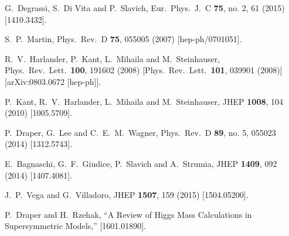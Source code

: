\documentclass[12pt]{article}
\begin{document}
\begin{thebibliography}{999}
  G.~Degrassi, S.~Di Vita and P.~Slavich,
  Eur.\ Phys.\ J.\ C {\bf 75}, no. 2, 61 (2015)
  [1410.3432].

  S.~P.~Martin,
  Phys.\ Rev.\ D {\bf 75}, 055005 (2007)
  [hep-ph/0701051].

  R.~V.~Harlander, P.~Kant, L.~Mihaila and M.~Steinhauser,
  Phys.\ Rev.\ Lett.\  {\bf 100}, 191602 (2008)
  [Phys.\ Rev.\ Lett.\  {\bf 101}, 039901 (2008)]
  [arXiv:0803.0672 [hep-ph]].

  P.~Kant, R.~V.~Harlander, L.~Mihaila and M.~Steinhauser,
  JHEP {\bf 1008}, 104 (2010)
  [1005.5709].

  P.~Draper, G.~Lee and C.~E.~M.~Wagner,
  Phys.\ Rev.\ D {\bf 89}, no. 5, 055023 (2014)
  [1312.5743].

  E.~Bagnaschi, G.~F.~Giudice, P.~Slavich and A.~Strumia,
  JHEP {\bf 1409}, 092 (2014)
  [1407.4081].
  
  J.~P.~Vega and G.~Villadoro,
  JHEP {\bf 1507}, 159 (2015)
  [1504.05200].
    
  P.~Draper and H.~Rzehak,
  ``A Review of Higgs Mass Calculations in Supersymmetric Models,''
  [1601.01890].



\end{thebibliography}
\end{document}

